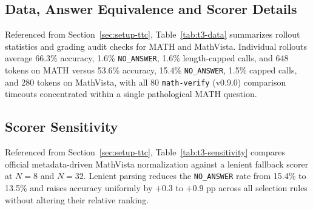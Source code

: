 \documentclass{article}
\begin{document}
\subsection{Data, Answer Equivalence and Scorer Details}
\label{app:ttc-data}
Referenced from Section~\ref{sec:setup-ttc}, Table~\ref{tab:t3-data} summarizes rollout statistics and grading audit checks for MATH and MathVista. Individual rollouts average 66.3\% accuracy, 1.6\% \texttt{NO\_ANSWER}, 1.6\% length-capped calls, and 648 tokens on MATH versus 53.6\% accuracy, 15.4\% \texttt{NO\_ANSWER}, 1.5\% capped calls, and 280 tokens on MathVista, with all 80 \texttt{math-verify} (v0.9.0) comparison timeouts concentrated within a single pathological MATH question.


\subsection{Scorer Sensitivity}
\label{app:ttc-sensitivity}
Referenced from Section~\ref{sec:setup-ttc}, Table~\ref{tab:t3-sensitivity} compares official metadata-driven MathVista normalization against a lenient fallback scorer at $N=8$ and $N=32$. Lenient parsing reduces the \texttt{NO\_ANSWER} rate from 15.4\% to 13.5\% and raises accuracy uniformly by $+0.3$ to $+0.9$ pp across all selection rules without altering their relative ranking.

\end{document}
